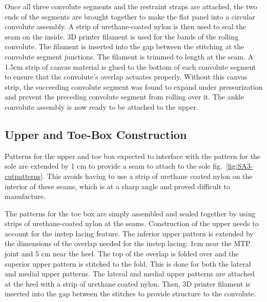 \documentclass[defaultstyle,11pt]{comps}
\begin{document}
Once all three convolute segments and the restraint straps are attached, the two ends of the segments are brought together to make the flat panel into a circular convolute assembly.
A strip of urethane-coated nylon is then used to seal the seam on the inside.
3D printer filament is used for the bands of the rolling convolute.
The filament is inserted into the gap between the stitching at the convolute segment junctions.
The filament is trimmed to length at the seam.
A 1.5cm strip of canvas material is glued to the bottom of each convolute segment to ensure that the convolute's overlap actuates properly.
Without this canvas strip, the succeeding convolute segment was found to expand under pressurization and prevent the preceding convolute segment from rolling over it.
The ankle convolute assembly is now ready to be attached to the upper.

\hypertarget{upper-and-toe-box-construction}{%
\subsection{Upper and Toe-Box Construction}\label{upper-and-toe-box-construction}}

Patterns for the upper and toe box expected to interface with the pattern for the sole are extended by 1 cm to provide a seam to attach to the sole fig.~\ref{fig:SA3-cutpatterns}.
This avoids having to use a strip of urethane coated nylon on the interior of these seams, which is at a sharp angle and proved difficult to manufacture.

The patterns for the toe box are simply assembled and sealed together by using strips of urethane-coated nylon at the seams.
Construction of the upper needs to account for the instep lacing feature.
The inferior upper pattern is extended by the dimensions of the overlap needed for the instep lacing: 1cm near the MTP joint and 5 cm near the heel.
The top of the overlap is folded over and the superior upper pattern is stitched to the fold.
This is done for both the lateral and medial upper patterns.
The lateral and medial upper patterns are attached at the heel with a strip of urethane coated nylon.
Then, 3D printer filament is inserted into the gap between the stitches to provide structure to the convolute.
\end{document}
